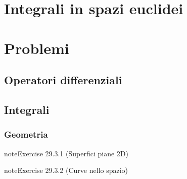 \documentclass[letterpaper,10pt,italian]{jupyterBook}
\begin{document}
\sphinxstepscope


\section{Integrali in spazi euclidei}
\label{\detokenize{ch/vector-calculus/integrals:integrali-in-spazi-euclidei}}\label{\detokenize{ch/vector-calculus/integrals:vector-calculus-integrals}}\label{\detokenize{ch/vector-calculus/integrals::doc}}
\sphinxstepscope


\section{Problemi}
\label{\detokenize{ch/vector-calculus/problems:problemi}}\label{\detokenize{ch/vector-calculus/problems:vector-calculus-problems}}\label{\detokenize{ch/vector-calculus/problems::doc}}

\subsection{Operatori differenziali}
\label{\detokenize{ch/vector-calculus/problems:operatori-differenziali}}\label{\detokenize{ch/vector-calculus/problems:vector-calculus-problems-derivatives}}

\subsection{Integrali}
\label{\detokenize{ch/vector-calculus/problems:integrali}}\label{\detokenize{ch/vector-calculus/problems:vector-calculus-problems-integrals}}

\subsubsection{Geometria}
\label{\detokenize{ch/vector-calculus/problems:geometria}}\label{\detokenize{ch/vector-calculus/problems:vector-calculus-problems-integrals-geometery}} \label{exercise:ch/vector-calculus/problems-exercise-0}

\begin{sphinxadmonition}{note}{Exercise 29.3.1 (Superfici piane \sphinxhyphen{} 2D)}


\end{sphinxadmonition}
 \label{exercise:ch/vector-calculus/problems-exercise-1}

\begin{sphinxadmonition}{note}{Exercise 29.3.2 (Curve nello spazio)}


\end{sphinxadmonition}
 \label{exercise:ch/vector-calculus/problems-exercise-2}
\end{document}
